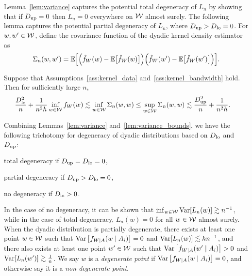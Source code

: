 Lemma~\ref{lem:variance} captures the potential total degeneracy of $L_n$ by
showing that if
$D_{\textup{up}}=0$ then $L_n=0$ everywhere on $\mathcal{W}$ almost surely.
The following lemma
captures the potential partial degeneracy of $L_n$, where
$D_{\textup{up}} > D_{\textup{lo}} = 0$.
For $w,w' \in \mathcal{W}$,
define the covariance function of the dyadic kernel density estimator as
%
\begin{equation*}
  \Sigma_n(w,w')
  =
  \mathbb{E}\Big[
    \Big(
      \hat f_W(w)
      - \mathbb{E}\big[\hat f_W(w)\big]
    \Big)
    \Big(
      \hat f_W(w')
      - \mathbb{E}\big[\hat f_W(w')\big]
    \Big)
  \Big].
\end{equation*}
%
\begin{lemma}
  \label{lem:variance_bounds}
  Suppose that Assumptions~\ref{ass:kernel_data}
  and~\ref{ass:kernel_bandwidth} hold.
  Then for sufficiently large $n$,
  \begin{align*}
    \frac{D_{\textup{lo}}^2}{n} + \frac{1}{n^2h}
    \inf_{w \in \mathcal{W}} f_W(w)
    &\lesssim
    \inf_{w \in \mathcal{W}} \Sigma_n(w,w)
    \leq
    \sup_{w \in \mathcal{W}} \Sigma_n(w,w)
    \lesssim
    \frac{D_{\textup{up}}^2}{n} + \frac{1}{n^2h}.
  \end{align*}
\end{lemma}

Combining Lemmas~\ref{lem:variance} and~\ref{lem:variance_bounds},
we have the following trichotomy
for degeneracy of dyadic distributions
based on $D_{\textup{lo}}$ and $D_{\textup{up}}$:
%
\begin{inlineroman}
\item
  total degeneracy if $D_{\textup{up}} = D_{\textup{lo}} = 0$,
\item
  partial degeneracy if $D_{\textup{up}} > D_{\textup{lo}} = 0$,
\item
  no degeneracy if $D_{\textup{lo}} > 0$.
\end{inlineroman}
%
In the case of no degeneracy,
it can be shown that
$\inf_{w \in \mathcal{W}} \operatorname{Var}[L_n(w)] \gtrsim n^{-1}$,
while in the case of total degeneracy,
$L_n(w) = 0$ for all $w \in \mathcal{W}$ almost surely.
When the dyadic distribution is partially degenerate,
there exists at least one point
$w\in\mathcal{W}$ such that
$\operatorname{Var}\left[f_{W \mid A}(w \mid A_i)\right] = 0$
and $\operatorname{Var}[L_n(w)]\lesssim h n^{-1}$,
and there also exists at least one point
$w'\in \mathcal{W}$ such that
$\operatorname{Var}\left[f_{W \mid A}(w' \mid A_i)\right] > 0$ and
$\operatorname{Var}[L_n(w')] \gtrsim \frac{1}{n}$.
We say $w$ is a \emph{degenerate point}
if $\operatorname{Var}\left[f_{W \mid A}(w \mid A_i)\right] = 0$,
and otherwise say it is a
\emph{non-degenerate point}.

